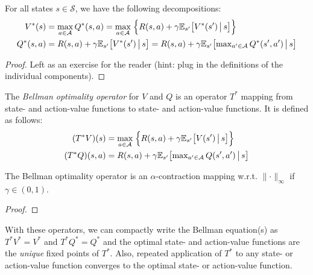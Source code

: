 				\begin{theorem}
					For all states \(s \in \mathcal{S}\), we have the following decompositions:
					\begin{align}
						V^\ast(s) &= \max_{a \in \mathcal{A}} Q^\ast(s, a)
						           = \max_{a \in \mathcal{A}} \;\Bigl\{ R(s, a) + \gamma \mathbb{E}_{s'}\bigl[ V^\ast(s') \,\big\vert\, s \bigr] \Bigr\} \\
						Q^\ast(s, a) &= R(s, a) + \gamma \mathbb{E}_{s'}\bigl[ V^\ast(s') \,\big\vert\, s \bigr]
						              = R(s, a) + \gamma \mathbb{E}_{s'}\bigl[ \textstyle\max_{a' \in \mathcal{A}}\displaystyle Q^\ast(s', a') \,\big\vert\, s \bigr]  \label{eq:bellmanOptEqQ}
					\end{align}
				\end{theorem}
				\begin{proof}
					Left as an exercise for the reader (hint: plug in the definitions of the individual components).
				\end{proof}

				\begin{definition}  \label{def:bellmanOptimalityOperator}
					The \emph{Bellman optimality operator} for \(V\) and \(Q\) is an operator \(T^\ast\) mapping from state- and action-value functions to state- and action-value functions. It is defined as follows:
					\begin{align}
						(T^\ast V)(s) &= \max_{a \in \mathcal{A}} \;\Bigl\{ R(s, a) + \gamma \mathbb{E}_{s'}\bigl[ V(s') \,\big\vert\, s \bigr] \Bigr\} \\
						(T^\ast Q)(s, a) &= R(s, a) + \gamma \mathbb{E}_{s'}\bigl[ \textstyle\max_{a' \in \mathcal{A}}\displaystyle Q(s', a') \,\big\vert\, s \bigr]
					\end{align}
				\end{definition}
				\begin{theorem}  \label{th:bellmanOptimalityOperatorContract}
					The Bellman optimality operator is an \(\alpha\)-contraction mapping w.r.t. \( \lVert \cdot \rVert_\infty \) if \( \gamma \in (0, 1) \).
				\end{theorem}
				\begin{proof}
				\end{proof}
				\begin{remark}
					With these operators, we can compactly write the Bellman equation(s) as \( T^\ast V^\ast = V^\ast \) and \( T^\ast Q^\ast = Q^\ast \) and the optimal state- and action-value functions are the \emph{unique} fixed points of \(T^\ast\). Also, repeated application of \(T^\ast\) to any state- or action-value function converges to the optimal state- or action-value function.
				\end{remark}

